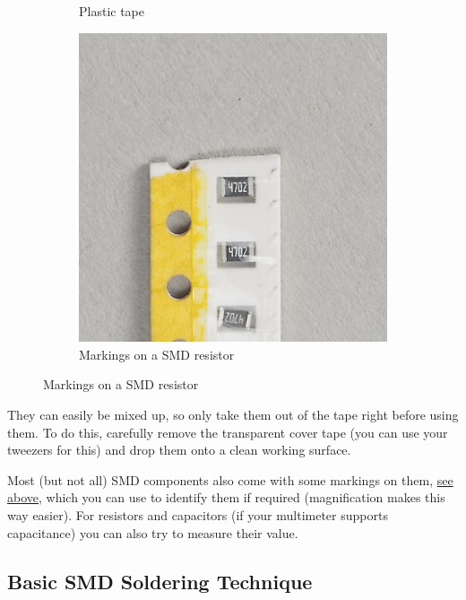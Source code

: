 \documentclass[12pt, a4paper]{article}
\begin{document}
\begin{figure}[H]
\begin{subfigure}{0.3\textwidth}
        \caption*{Plastic tape}
    \end{subfigure}
    \hspace{2mm}
    \begin{subfigure}{0.3\textwidth}
        \includegraphics[width=\textwidth]{images/01_03_smd_resistor_markings.jpg}
        \caption*{Markings on a SMD resistor}
        \label{fig:resistor_markings}
    \end{subfigure}
\end{figure}

They can easily be mixed up, so only take them out of the tape right before using them. To do
this, carefully remove the transparent cover tape (you can use your tweezers for this) and drop
them onto a clean working surface.

Most (but not all) SMD components also come with some markings on them,
\hyperref[fig:resistor_markings]{see above}, which you can use to identify them if required
(magnification makes this way easier). For resistors and capacitors (if your multimeter supports
capacitance) you can also try to measure their value.

\pagebreak
\subsection{Basic SMD Soldering Technique}
\label{sec:basic_smd_soldering_techniques}
\end{document}
